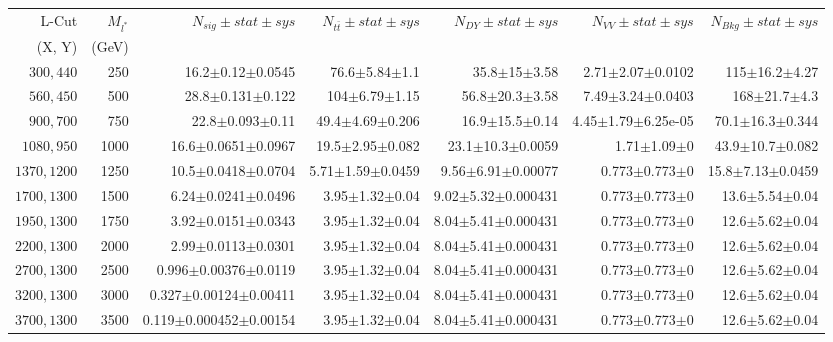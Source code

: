 \documentclass[]{article}
\begin{document}
\begin{table}
\begin{center}
\scriptsize{
\begin{tabular}{ |r|r|r|r|r|r|r|}
\hline 
L-Cut & $M_{l^*}$ & $N_{sig}\pm stat \pm sys $ &$N_{t\bar{t}}\pm stat \pm sys $ & $N_{DY}\pm stat \pm sys $ & $N_{VV}\pm stat \pm sys $ &$N_{Bkg}\pm stat \pm sys$\\
(X, Y) & (GeV) & && &&\\
\hline 
$300, 440$ & 250 & 16.2$\pm$0.12$\pm$0.0545 & 76.6$\pm$5.84$\pm$1.1 & 35.8$\pm$15$\pm$3.58 & 2.71$\pm$2.07$\pm$0.0102 & 115$\pm$16.2$\pm$4.27 \\
$560, 450$ & 500 & 28.8$\pm$0.131$\pm$0.122 & 104$\pm$6.79$\pm$1.15 & 56.8$\pm$20.3$\pm$3.58 & 7.49$\pm$3.24$\pm$0.0403 & 168$\pm$21.7$\pm$4.3 \\
$900, 700$ & 750 & 22.8$\pm$0.093$\pm$0.11 & 49.4$\pm$4.69$\pm$0.206 & 16.9$\pm$15.5$\pm$0.14 & 4.45$\pm$1.79$\pm$6.25e-05 & 70.1$\pm$16.3$\pm$0.344 \\
$1080,950$ & 1000 & 16.6$\pm$0.0651$\pm$0.0967 & 19.5$\pm$2.95$\pm$0.082 & 23.1$\pm$10.3$\pm$0.0059 & 1.71$\pm$1.09$\pm$0 & 43.9$\pm$10.7$\pm$0.082 \\
$1370,1200$ & 1250 & 10.5$\pm$0.0418$\pm$0.0704 & 5.71$\pm$1.59$\pm$0.0459 & 9.56$\pm$6.91$\pm$0.00077 & 0.773$\pm$0.773$\pm$0 & 15.8$\pm$7.13$\pm$0.0459 \\
$1700,1300$ & 1500 & 6.24$\pm$0.0241$\pm$0.0496 & 3.95$\pm$1.32$\pm$0.04 & 9.02$\pm$5.32$\pm$0.000431 & 0.773$\pm$0.773$\pm$0 & 13.6$\pm$5.54$\pm$0.04 \\
$1950,1300$ & 1750 & 3.92$\pm$0.0151$\pm$0.0343 & 3.95$\pm$1.32$\pm$0.04 & 8.04$\pm$5.41$\pm$0.000431 & 0.773$\pm$0.773$\pm$0 & 12.6$\pm$5.62$\pm$0.04 \\
$2200,1300$ & 2000 & 2.99$\pm$0.0113$\pm$0.0301 & 3.95$\pm$1.32$\pm$0.04 & 8.04$\pm$5.41$\pm$0.000431 & 0.773$\pm$0.773$\pm$0 & 12.6$\pm$5.62$\pm$0.04 \\
$2700,1300$ & 2500 & 0.996$\pm$0.00376$\pm$0.0119 & 3.95$\pm$1.32$\pm$0.04 & 8.04$\pm$5.41$\pm$0.000431 & 0.773$\pm$0.773$\pm$0 & 12.6$\pm$5.62$\pm$0.04 \\
$3200,1300$ & 3000 & 0.327$\pm$0.00124$\pm$0.00411 & 3.95$\pm$1.32$\pm$0.04 & 8.04$\pm$5.41$\pm$0.000431 & 0.773$\pm$0.773$\pm$0 & 12.6$\pm$5.62$\pm$0.04 \\
$3700,1300$ & 3500 & 0.119$\pm$0.000452$\pm$0.00154 & 3.95$\pm$1.32$\pm$0.04 & 8.04$\pm$5.41$\pm$0.000431 & 0.773$\pm$0.773$\pm$0 & 12.6$\pm$5.62$\pm$0.04 \\

\end{tabular}}
\end{center}
\end{table}
\end{document}
